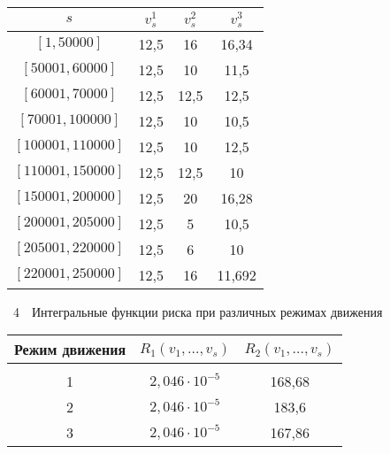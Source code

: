 \begin{multicols}{2}
\begin{center}
{\small \begin{tabular}{|c|c|c|c|}
\hline
$s$&$v_s^1$&$v_s^2$&$v_s^3$\\
\hline
\hphantom{9999}$[1, 50000]$&12,5&16&16,34\\                                               
$[50001, 60000]$&12,5&10&11,5\hphantom{9}\\                                            
$[60001, 70000]$&12,5&\hphantom{,9}12,5&12,5\hphantom{9}\\                                          
\hphantom{9}$[70001, 100000]$&12,5&10&10,5\hphantom{9}\\                                           
$[100001, 110000]$&12,5&10&12,5\hphantom{9}\\   
 $[110001, 150000]$&12,5&\hphantom{,9}12,5&10\hphantom{,99}\\     
 $[150001, 200000]$&12,5&20&16,28\\    
 $[200001, 205000]$&12,5&\hphantom{9}5&10,5\hphantom{9}\\      
 $[205001, 220000]$&12,5&\hphantom{9}6&10\hphantom{,99}\\        
 $[220001, 250000]$&12,5&16&\hphantom{9}11,692\\   
\hline
\end{tabular}
}
\end{center}
\vspace*{6pt}

\noindent
{{\tablename~4}\ \ \small{Интегральные функции рис\-ка при различных режимах движения
}}

\vspace*{3pt}

\begin{center}
{\small 
\tabcolsep=6.4pt
\begin{tabular}{|c|c|c|}
\hline
Режим движения & $R_1\left(v_1, \ldots , v_s\right)$ & $R_2\left(v_1, \ldots , v_s\right)$ \\
\hline
&&\\[-10pt]
1&$2{,}046\cdot 10^{-5}$ & 168,68\\
2& $2{,}046\cdot 10^{-5}$ & 183,6\hphantom{9}\\
3&$2{,}046\cdot 10^{-5}$ & 167,86\\
\hline
\end{tabular}
}
\end{center}


\end{multicols}
